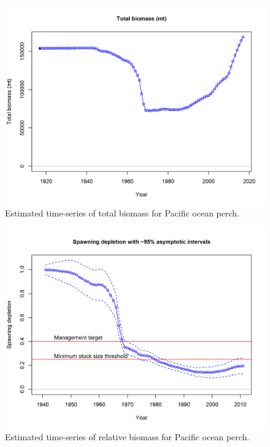 \documentclass[12pt,]{article}
\begin{document}
\begin{figure}
\centering
\includegraphics{r4ss/plots_mod1/ts1_Total_biomass_(mt).png}
\caption{Estimated time-series of total biomass for Pacific ocean perch.
\label{fig:total_bio}}
\end{figure}

\FloatBarrier

\begin{figure}
\centering
\includegraphics{r4ss/plots_mod1/ts9_Spawning_depletion_with_95_asymptotic_intervals_intervals.png}
\caption{Estimated time-series of relative biomass for Pacific ocean
perch. \label{fig:depl}}
\end{figure}
\end{document}
